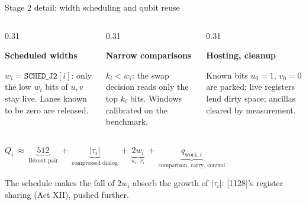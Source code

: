 \documentclass[aspectratio=169,11pt]{beamer}
\newcommand{\blocktitle}[1]{{\bfseries #1}\par\vskip1mm}
\begin{document}
\begin{frame}{Stage 2 detail: width scheduling and qubit reuse}
  \begin{columns}[T]
    \begin{column}{0.31\textwidth}
      \begin{panel}[equal height group=ws]
        \blocktitle{Scheduled widths}
        \small $w_i=\texttt{SCHED\_J2}[i]$: only the low $w_i$ bits of $u,v$ stay live. Lanes known to be zero are released.
      \end{panel}
    \end{column}
    \begin{column}{0.31\textwidth}
      \begin{panel}[equal height group=ws]
        \blocktitle{Narrow comparisons}
        \small $k_i<w_i$: the swap decision reads only the top $k_i$ bits. Windows calibrated on the benchmark.
      \end{panel}
    \end{column}
    \begin{column}{0.31\textwidth}
      \begin{panel}[equal height group=ws]
        \blocktitle{Hosting, cleanup}
        \small Known bits $u_0=1$, $v_0=0$ are parked; live registers lend dirty space; ancillas cleared by measurement.
      \end{panel}
    \end{column}
  \end{columns}
  \vskip3mm
  \centering
  $Q_i\ \approx\ \underbrace{512}_{\text{Bézout pair}}\ +\ \underbrace{|\tau_i|}_{\text{compressed dialog}}\ +\ \underbrace{2w_i}_{u_i,\,v_i}\ +\ \underbrace{q_{\mathrm{work},i}}_{\text{comparison, carry, control}}$\par
  \vskip2mm
  \raggedright{\small The schedule makes the fall of $2w_i$ absorb the growth of $|\tau_i|$: [1128]'s register sharing (Act XII), pushed further.}
\end{frame}
\end{document}
